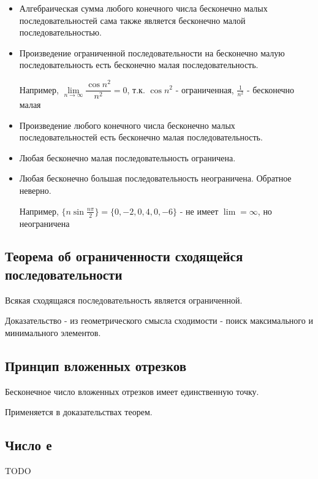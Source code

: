 \begin{itemize}

\item 
Алгебраическая сумма любого конечного числа бесконечно малых последовательностей сама также является бесконечно малой последовательностью.

\item 
Произведение ограниченной последовательности на бесконечно малую последовательность есть бесконечно малая последовательность.

Например, $\lim\limits_{n \to \infty} \dfrac{\cos{n^2}}{n^2} = 0$, т.к. $\cos{n^2}$ - ограниченная, $\frac{1}{n^2}$ - бесконечно малая

\item 
Произведение любого конечного числа бесконечно малых последовательностей есть бесконечно малая последовательность.

\item 
Любая бесконечно малая последовательность ограничена.

\item 
Любая бесконечно большая последовательность неограничена. Обратное неверно.

Например, $\{ n \sin{\frac{n \pi}{2}}  \} = \{ 0,-2,0,4,0,-6 \}$ - не имеет $\lim = \infty$, но неограничена
\end{itemize}

\subsection{Теорема об ограниченности сходящейся последовательности}

Всякая сходящаяся последовательность является ограниченной.

Доказательство - из геометрического смысла сходимости - поиск максимального и минимального элементов.


\subsection{Принцип вложенных отрезков}

Бесконечное число вложенных отрезков имеет единственную точку.

Применяется в доказательствах теорем.

\subsection{Число е}

TODO

